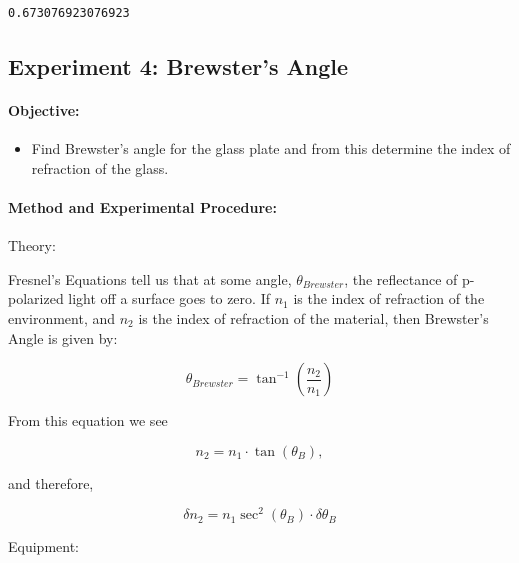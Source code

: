 \documentclass[11pt]{article}
\providecommand{\tightlist}{%
      \setlength{\itemsep}{0pt}\setlength{\parskip}{0pt}}
\newcommand{\prompt}[4]{
        \llap{{\color{#2}[#3]: #4}}\vspace{-1.25em}
    }
\begin{document}
            \begin{tcolorbox}[breakable, boxrule=.5pt, size=fbox, pad at break*=1mm, opacityfill=0]
\prompt{Out}{outcolor}{57}{\hspace{3.5pt}}
\begin{Verbatim}[commandchars=\\\{\}]
0.673076923076923
\end{Verbatim}
\end{tcolorbox}
        
    \hypertarget{experiment-4-brewsters-angle}{%
\subsection{Experiment 4: Brewster's
Angle}\label{experiment-4-brewsters-angle}}

\hypertarget{objective}{%
\paragraph{Objective:}\label{objective}}

\begin{itemize}
\tightlist
\item
  Find Brewster's angle for the glass plate and from this determine the
  index of refraction of the glass.
\end{itemize}

\hypertarget{method-and-experimental-procedure}{%
\paragraph{Method and Experimental
Procedure:}\label{method-and-experimental-procedure}}

Theory:

Fresnel's Equations tell us that at some angle, \(\theta_{Brewster}\),
the reflectance of p-polarized light off a surface goes to zero. If
\(n_1\) is the index of refraction of the environment, and \(n_2\) is
the index of refraction of the material, then Brewster's Angle is given
by:

\[ \theta_{Brewster} = \tan ^{-1}\left(\frac{n_2}{n_1}\right)\]

From this equation we see

\[ n_2  = n_1 \cdot \tan(\theta_B),\]

and therefore,

\[\delta n_2 = n_1 \sec^2(\theta_B)  \cdot\delta \theta_B\]

Equipment:
\end{document}
